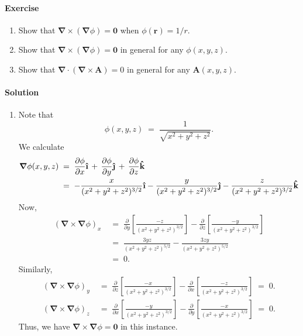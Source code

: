 \documentclass[10pt]{article}
\let\vec\boldsymbol
\newcommand{\uveci}{{\bm{\hat{\textnormal{\bfseries\i}}}}}
\newcommand{\uvecj}{{\bm{\hat{\textnormal{\bfseries\j}}}}}
\newcommand{\uveck}{{\bm{\hat{\textnormal{\bfseries k}}}}}
\newcommand\grad[1]{\vec{\nabla}#1}
\newcommand\divg[1]{\vec{\nabla}\cdot#1}
\newcommand\curl[1]{\vec{\nabla}\times#1}
\newcounter{prob}
\def\problem{\stepcounter{prob}\paragraph{Exercise \arabic{prob}}}
\def\solution{\paragraph{Solution}}
\begin{document}
        \problem 
        \begin{enumerate}
                \item Show that $\curl(\grad{\phi}) = \vec{0}$ when $\phi(\vec{r}) = 1 / r$.
                \item Show that $\curl(\grad{\phi}) = \vec{0}$ in general for any $\phi(x,y,z)$.
                \item Show that $\divg(\curl{\vec{A}}) = 0$ in general for any $\vec{A}(x,y,z)$.
        \end{enumerate}
        \solution
        \begin{enumerate}
                \item Note that
                \[
                        \phi(x,y,z) \;=\; \frac{1}{\sqrt{x^2 + y^2 + z^2}}.
                \]
                We calculate
                \begin{align*}
                        \grad{\phi(x, y, z)} \;&=\; \frac{\partial \phi}{\partial x}\uveci \,+\,
                                                        \frac{\partial \phi}{\partial y}\uvecj \,+\, \frac{\partial \phi}{\partial z}\uveck \\
                                \;&=\; -\frac{x}{(x^2 + y^2 + z^2)^{3 / 2}}\uveci - 
                                                \frac{y}{(x^2 + y^2 + z^2)^{3 / 2}}\uvecj - \frac{z}{(x^2 + y^2 + z^2)^{3 / 2}}\uveck
                \end{align*}
                Now,
                \begin{align*}
                        (\curl{\grad{\phi}})_x \;&=\; \frac{\partial}{\partial y} \left[ \frac{-z}{(x^2 + y^2 + z^2)^{3 / 2}}\right] 
                                - \frac{\partial}{\partial z} \left[ \frac{-y}{(x^2 + y^2 + z^2)^{3 / 2}}\right] \\
                                \;&=\; \frac{3yz}{(x^2 + y^2 + z^2)^{5 / 2}} - \frac{3zy}{(x^2 + y^2 + z^2)^{5 / 2}} \\
                                \;&=\; 0.
                \end{align*}
                Similarly,
                \begin{align*}
                        (\curl{\grad{\phi}})_y \;&=\; \frac{\partial}{\partial z} \left[ \frac{-x}{(x^2 + y^2 + z^2)^{3 / 2}}\right] 
                                - \frac{\partial}{\partial x} \left[ \frac{-z}{(x^2 + y^2 + z^2)^{3 / 2}}\right] \;=\; 0. \\
                        (\curl{\grad{\phi}})_z \;&=\; \frac{\partial}{\partial x} \left[ \frac{-y}{(x^2 + y^2 + z^2)^{3 / 2}}\right] 
                                - \frac{\partial}{\partial y} \left[ \frac{-x}{(x^2 + y^2 + z^2)^{3 / 2}}\right] \;=\; 0.
                \end{align*}
                Thus, we have $\curl{\grad{\phi}} = \vec{0}$ in this instance.


\end{enumerate}
\end{document}
